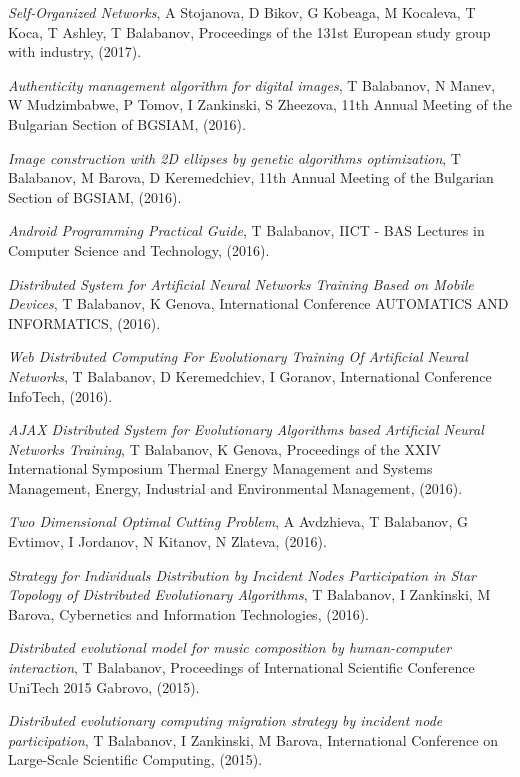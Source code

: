 \documentclass[english,a4paper]{europasscv}
\begin{document}
\begin{europasscv}
{\begin{ecvitemize}
    \item \textit{Self-Organized Networks}, A Stojanova, D Bikov, G Kobeaga, M Kocaleva, T Koca, T Ashley, T Balabanov, Proceedings of the 131st European study group with industry, (2017).
    \item \textit{Authenticity management algorithm for digital images}, T Balabanov, N Manev, W Mudzimbabwe, P Tomov, I Zankinski, S Zheezova, 11th Annual Meeting of the Bulgarian Section of BGSIAM, (2016).
    \item \textit{Image construction with 2D ellipses by genetic algorithms optimization}, T Balabanov, M Barova, D Keremedchiev, 11th Annual Meeting of the Bulgarian Section of BGSIAM, (2016).
    \item \textit{Android Programming Practical Guide}, T Balabanov, IICT - BAS Lectures in Computer Science and Technology, (2016).
    \item \textit{Distributed System for Artificial Neural Networks Training Based on Mobile Devices}, T Balabanov, K Genova, International Conference AUTOMATICS AND INFORMATICS, (2016).
    \item \textit{Web Distributed Computing For Evolutionary Training Of Artificial Neural Networks}, T Balabanov, D Keremedchiev, I Goranov, International Conference InfoTech, (2016).
    \item \textit{AJAX Distributed System for Evolutionary Algorithms based Artificial Neural Networks Training}, T Balabanov, K Genova, Proceedings of the XXIV International Symposium Thermal Energy Management and Systems Management, Energy, Industrial and Environmental Management, (2016).
    \item \textit{Two Dimensional Optimal Cutting Problem}, A Avdzhieva, T Balabanov, G Evtimov, I Jordanov, N Kitanov, N Zlateva, (2016).
    \item \textit{Strategy for Individuals Distribution by Incident Nodes Participation in Star Topology of Distributed Evolutionary Algorithms}, T Balabanov, I Zankinski, M Barova, Cybernetics and Information Technologies, (2016).
    \item \textit{Distributed evolutional model for music composition by human-computer interaction}, T Balabanov, Proceedings of International Scientific Conference UniTech 2015 Gabrovo, (2015).
    \item \textit{Distributed evolutionary computing migration strategy by incident node participation}, T Balabanov, I Zankinski, M Barova, International Conference on Large-Scale Scientific Computing, (2015).

\end{ecvitemize}}
\end{europasscv}
\end{document}

